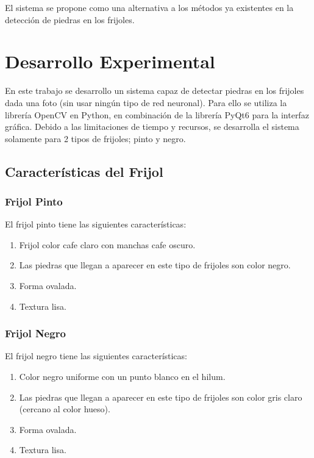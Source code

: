 \documentclass[conference]{IEEEtran}
\begin{document}
    El sistema se propone como una alternativa a los métodos ya existentes en la detección de piedras en los frijoles\cite{limpieza}.

\section{Desarrollo Experimental}
    En este trabajo se desarrollo un sistema capaz de detectar piedras en los frijoles dada una foto (sin usar ningún tipo de red neuronal). Para ello se utiliza la librería OpenCV\cite{opencv} en Python\cite{python}, en combinación de la librería PyQt6\cite{pyqt6} para la interfaz gráfica.
    Debido a las limitaciones de tiempo y recursos, se desarrolla el sistema solamente para 2 tipos de frijoles; pinto y negro. 

    \subsection{Características del Frijol}
    \subsubsection{Frijol Pinto}
    El frijol pinto tiene las siguientes características:
    \begin{enumerate}
        \item Frijol color cafe claro con manchas cafe oscuro.
        \item Las piedras que llegan a aparecer en este tipo de frijoles son color negro.
        \item Forma ovalada.
        \item Textura lisa.
    \end{enumerate}

    \subsubsection{Frijol Negro}
    El frijol negro tiene las siguientes características:
    \begin{enumerate}
        \item Color negro uniforme con un punto blanco en el hilum\cite{semillas}.
        \item Las piedras que llegan a aparecer en este tipo de frijoles son color gris claro (cercano al color hueso\cite{pantone}).
        \item Forma ovalada.
        \item Textura lisa.
    \end{enumerate}
\end{document}
